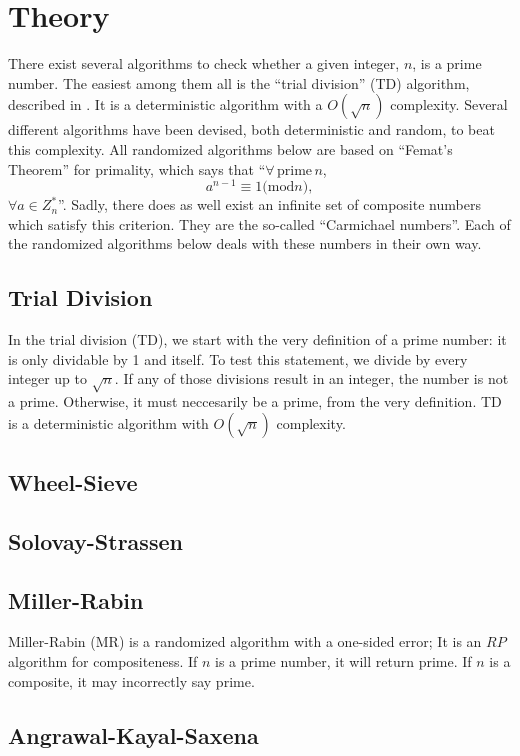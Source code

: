 \section{Theory}
There exist several algorithms to check whether a given integer, $n$, is a prime number.
The easiest among them all is the ``trial division'' (TD) algorithm, described in .
It is a deterministic algorithm with a $O(\sqrt{n})$ complexity.
Several different algorithms have been devised, both deterministic and random, to beat this complexity.
All randomized algorithms below are based on ``Femat's Theorem'' for primality, which says that ``$\forall \, \mathrm{prime} \, n$,
\begin{equation}
	a^{n-1} \equiv 1 \mathrm{(mod } n \mathrm{)},
\end{equation}
$\forall a \in Z_n^*$''.
Sadly, there does as well exist an infinite set of composite numbers which satisfy this criterion.
They are the so-called ``Carmichael numbers''.
Each of the randomized algorithms below deals with these numbers in their own way.

\subsection{Trial Division} \label{sec:TD_theory}
In the trial division (TD), we start with the very definition of a prime number: it is only dividable by 1 and itself.
To test this statement, we divide by every integer up to $\sqrt{n}$.
If any of those divisions result in an integer, the number is not a prime.
Otherwise, it must neccesarily be a prime, from the very definition.
TD is a deterministic algorithm with $O(\sqrt{n})$ complexity.

\subsection{Wheel-Sieve} \label{sec:WS_theory}

\subsection{Solovay-Strassen} \label{sec:SS_theory}

\subsection{Miller-Rabin} \label{sec:MR_theory}
Miller-Rabin (MR) is a randomized algorithm with a one-sided error; It is an $RP$ algorithm for compositeness.
If $n$ is a prime number, it will return prime. If $n$ is a composite, it may incorrectly say prime.

\subsection{Angrawal-Kayal-Saxena} \label{sec:AKS_theory}


